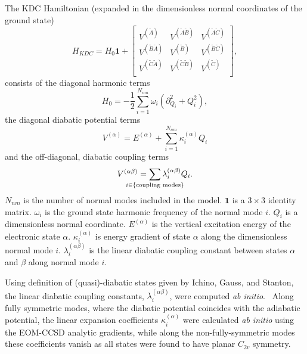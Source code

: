 \documentclass{article}
\begin{document}
The KDC Hamiltonian (expanded in the dimensionless normal coordinates of the
ground state)
\begin{equation}
    H _{KDC} = 
    H _0 \mathbf{1}
    +
    \begin{bmatrix}
    V ^{(\tilde{A})} & V ^{(\tilde{A}\tilde{B})} & V ^{(\tilde{A}\tilde{C})} \\
    V ^{(\tilde{B}\tilde{A})} & V ^{(\tilde{B})} & V ^{(\tilde{B}\tilde{C})} \\
    V ^{(\tilde{C}\tilde{A})} & V ^{(\tilde{C}\tilde{B})} & V ^{(\tilde{C})} \\
    \end{bmatrix},
    \label{eq:kdc}
\end{equation}
consists of the diagonal harmonic terms
\begin{equation}
    H _0 = -\frac{1}{2} \sum _{i = 1} ^ {N _{nm}} 
    \omega _i 
    \left(
    \partial ^2 _{Q _i}
    + 
    Q _i ^ 2
    \right),
    \label{eq:kdc_H0}
\end{equation}
the diagonal diabatic potential terms
\begin{equation}
    V ^{(\alpha)} 
    = 
    E ^{(\alpha)}
    +
    \sum _{i = 1} ^ {N _{nm}} 
    \kappa _i ^{(\alpha)}
    Q _i
    \label{eq:kdc_Vdiag}
\end{equation}
and the off-diagonal, diabatic coupling terms
\begin{equation}
    V ^{(\alpha\beta)} 
    = 
    \smashoperator{\sum _{i \in \{\text{coupling modes}\}}}
    \lambda _i ^{(\alpha \beta)}
    Q _i.
    \label{eq:kdc_Voff}
\end{equation}
$N _{nm}$ is the number of normal modes included in the model. $\mathbf{1}$ is
a $3 \times 3$ identity matrix. $\omega _i$ is the ground state harmonic
frequency of the normal mode $i$. $Q_i$ is a dimensionless normal coordinate.
$E ^{(\alpha)}$ is the vertical excitation energy of the electronic state
$\alpha$. $\kappa ^{(\alpha)} _i$ is energy gradient of state $\alpha$ along
the dimensionless normal mode $i$. $\lambda ^{(\alpha \beta)} _i$ is the linear
diabatic coupling constant between states $\alpha$ and $\beta$ along normal
mode $i$.

Using definition of (quasi)-diabatic states given by Ichino, Gauss, and
Stanton, the linear diabatic coupling constants, $\lambda ^{(\alpha \beta)}
_i$, were computed \emph{ab initio}.~\autocite{Stanton:EOMIPdeg:09} Along fully
symmetric modes, where the diabatic potential coincides with the adiabatic
potential, the linear expansion coefficients $\kappa ^{(\alpha)} _i$ were
calculated \emph{ab initio} using the EOM-CCSD analytic gradients, while along
the non-fully-symmetric modes these coefficients vanish as all states were
found to have planar $C_{2v}$ symmetry.~\autocite{StantonGauss:EOMgrad:94}
\end{document}
